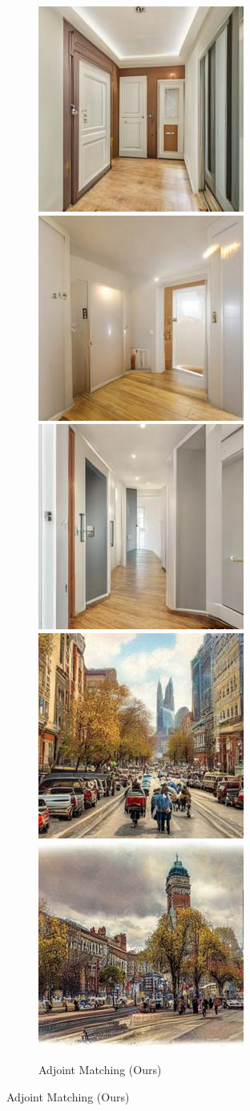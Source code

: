 \begin{figure}[h!]
\begin{subfigure}[t]{0.32\linewidth}
    \end{subfigure}\hfill
    \begin{subfigure}[t]{0.32\linewidth}
    \centering
    \caption*{Adjoint Matching (Ours)}
	\includegraphics[width=0.320\linewidth]{figs/samples_appendix_3/adjmat_cfg_2_ode_prompt_6_image_1.jpg}\;%
	\includegraphics[width=0.320\linewidth]{figs/samples_appendix_3/adjmat_cfg_2_ode_prompt_6_image_2.jpg}\;%
	\includegraphics[width=0.320\linewidth]{figs/samples_appendix_3/adjmat_cfg_2_ode_prompt_6_image_3.jpg}\\ 
	\includegraphics[width=0.320\linewidth]{figs/samples_appendix_3/adjmat_cfg_2_ode_prompt_14_image_1.jpg}\;%
	\includegraphics[width=0.320\linewidth]{figs/samples_appendix_3/adjmat_cfg_2_ode_prompt_14_image_2.jpg}\;%

\end{subfigure}
\end{figure}
